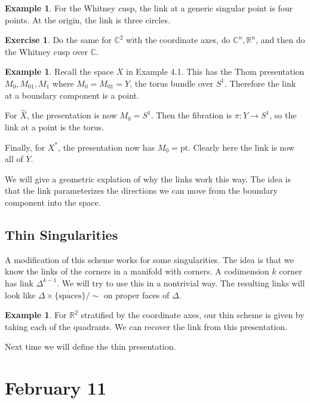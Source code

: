 \documentclass[leqno, openany]{memoir}
\theoremstyle{definition}
\newtheorem{exm}[thm]{Example}
\newtheorem{exer}[thm]{Exercise}
\theoremstyle{remark}
\theoremstyle{plain}
\theoremstyle{definition}
\theoremstyle{remark}
\newcommand{\R}{\mathbb{R}}
\newcommand{\C}{\mathbb{C}}
\newcommand{\mr}[1]{\mathrm{#1}}
\begin{document}
\begin{exm}
    For the Whitney cusp, the link at a generic singular point is four points. At the origin, the link is three circles.
\end{exm}

\begin{exer}
    Do the same for $\C^2$ with the coordinate axes, do $\C^n, \R^n$, and then do the Whitney cusp over $\C$.
\end{exer}

\begin{exm}
    Recall the space $\overline{X}$ in Example 4.1. This has the Thom presentation $M_0, M_{01}, M_1$ where $M_0 = M_{01} = Y$, the torus bundle over $S^1$. Therefore the link at a boundary component is a point.

    For $\widehat{X}$, the presentation is now $M_0 = S^1$. Then the fibration is $\pi: Y \to S^1$, so the link at a point is the torus.

    Finally, for $X^*$, the presentation now has $M_0 = \mr{pt}$. Clearly here the link is now all of $Y$.
\end{exm}
We will give a geometric explation of why the links work this way. The idea is that the link parameterizes the directions we can move from the boundary component into the space.

\section{Thin Singularities}%
\label{sec:thin_singularities}

A modification of this scheme works for some singularities. The idea is that we know the links of the corners in a manifold with corners. A codimension $k$ corner has link $\Delta^{k-1}$. We will try to use this in a nontrivial way. The resulting links will look like $\Delta \times \{\mr{spaces}\}/\sim$ on proper faces of $\Delta$.

\begin{exm}
    For $\R^2$ stratified by the coordinate axes, our thin scheme is given by taking each of the quadrants. We can recover the link from this presentation.
\end{exm}
Next time we will define the thin presentation.

\chapter{February 11}%
\label{cha:february_11}
\end{document}

